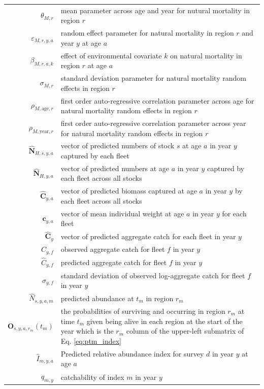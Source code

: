 \documentclass[
]{article}
\begin{document}
\begin{longtable}[c]{r p{}}
$\theta_{M,r}$ & mean parameter across age and year for nutural mortality in region $r$\\
$\varepsilon_{M,r,y,a}$ & random effect parameter for natural mortality in region $r$ and year $y$ at age $a$\\
$\beta_{M,r,a,k}$ & effect of environmental covariate $k$ on natural mortality in region $r$ at age $a$\\
$\sigma_{M,r}$ & standard deviation parameter for natural mortality random effects in region $r$\\
$\rho_{M,\text{age},r}$ & first order auto-regressive correlation parameter across age for natural mortality random effects in region $r$\\
$\rho_{M,\text{year},r}$ & first order auto-regressive correlation parameter across year for natural mortality random effects in region $r$\\
$\widehat{\mathbf{N}}_{H,s,y,a}$ & vector of predicted numbers of stock $s$ at age $a$ in year $y$ captured by each fleet\\
$\widehat{\mathbf{N}}_{H,y,a}$ & vector of predicted numbers at age $a$ in year $y$ captured by each fleet across all stocks\\
$\widehat{\mathbf{C}}_{y,a}$ & vector of predicted biomass captured at age $a$ in year $y$ by each fleet across all stocks\\
$\mathbf{c}_{y,a}$ & vector of mean individual weight at age $a$ in year $y$ for each fleet\\
$\widehat{\mathbf{C}}_y$ & vector of predicted aggregate catch for each fleet in year $y$\\
$C_{y,f}$ & observed aggregate catch for fleet $f$ in year $y$\\
$\widehat C_{y,f}$ & predicted aggregate catch for fleet $f$ in year $y$\\
$\sigma_{y,f}$ & standard deviation of observed log-aggregate catch for fleet $f$ in year $y$\\
$\widehat{N}_{s,y,a,m}$ & predicted abundance at $t_m$ in region $r_m$\\
$\mathbf{O}_{s,y,a,r_m}(t_m)$ & the probabilities of surviving and occurring in region $r_m$ at time $t_m$ given being alive in each region at the start of the year which is the $r_m$ column of the upper-left submatrix of Eq. \ref{eq:ptm_index}\\
$\widehat I_{m,y,a}$ & Predicted relative abundance index for survey $d$ in year $y$ at age $a$ \\
$q_{m,y}$ & catchability of index $m$ in year $y$\\

\end{longtable}
\end{document}
